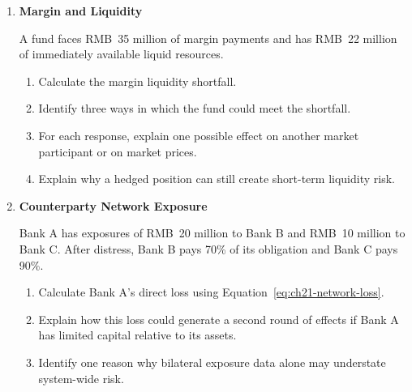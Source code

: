 \begin{enumerate}
\begin{enumerate}
\item Calculate the price after forced sales of 150 million units.

\item Explain why the price-impact coefficient may increase during market stress.

\item Explain how mark-to-market losses at other institutions can generate additional asset sales.

\end{enumerate}


\item \textbf{Margin and Liquidity}

A fund faces RMB~35 million of margin payments and has RMB~22 million of immediately available liquid resources.

\begin{enumerate}

\item Calculate the margin liquidity shortfall.

\item Identify three ways in which the fund could meet the shortfall.

\item For each response, explain one possible effect on another market participant or on market prices.

\item Explain why a hedged position can still create short-term liquidity risk.

\end{enumerate}


\item \textbf{Counterparty Network Exposure}

Bank A has exposures of RMB~20 million to Bank B and RMB~10 million to Bank C. After distress, Bank B pays 70\% of its obligation and Bank C pays 90\%.

\begin{enumerate}

\item Calculate Bank A's direct loss using Equation~\eqref{eq:ch21-network-loss}.

\item Explain how this loss could generate a second round of effects if Bank A has limited capital relative to its assets.

\item Identify one reason why bilateral exposure data alone may understate system-wide risk.


\end{enumerate}
\end{enumerate}
